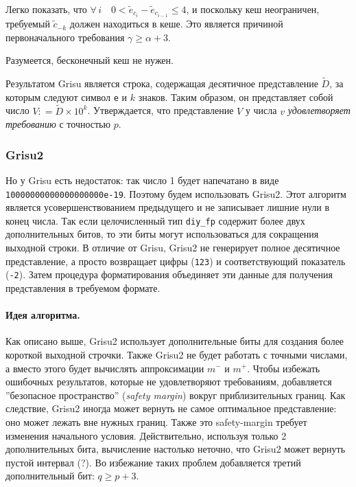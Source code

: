 \documentclass[specialist,subf,href,colorlinks=true,14pt
,times,mtpro,specialist
]{disser}
\begin{document}
Легко показать, что $\forall \, i \quad 0 < \tilde{e}_{c_i} - \tilde{e}_{c_{i-1}} \leqslant 4$, и поскольку кеш неограничен, требуемый $\tilde{c}_{-k}$ должен находиться в кеше. 
Это является причиной первоначального требования $\gamma \geqslant \alpha + 3$.

Разумеется, бесконечный кеш не нужен. 

Результатом \textsf{Grisu} является строка, содержащая десятичное представление $\tilde{D}$, за которым следуют символ \texttt{e} и $k$ знаков. 
Таким образом, он представляет собой число $V: = \tilde{D} \times 10^k$. 
Утверждается, что представление $V$ у числа $v$ \textit{удовлетворяет требованию} с точностью $p$.

\subsubsection{\textsf{Grisu2}}
Но у \textsf{Grisu} есть недостаток: так число 1 будет напечатано в виде \\ \texttt{10000000000000000000e-19}.
Поэтому будем использовать \textsf{Grisu2}.
Этот алгоритм является усовершенствованием предыдущего и не записывает лишние нули в конец числа.
Так если целочисленный тип \texttt{diy\_fp} содержит более двух дополнительных битов, то эти биты могут использоваться для сокращения выходной строки.
В отличие от \textsf{Grisu}, \textsf{Grisu2} не генерирует полное десятичное представление, а просто возвращает цифры (\texttt{123}) и соответствующий показатель (\texttt{-2}). 
Затем процедура форматирования объединяет эти данные для получения представления в требуемом формате.

\paragraph{Идея алгоритма.} 
Как описано выше, \textsf{Grisu2} использует дополнительные биты для создания более короткой выходной строчки. 
Также \textsf{Grisu2} не будет работать с точными числами, а вместо этого будет вычислять аппроксимации $m^{-}$ и $m^+$. 
Чтобы избежать ошибочных результатов, которые не удовлетворяют требованиям, добавляется ''безопасное пространство'' (\textit{safety margin}) вокруг приблизительных границ. 
Как следствие, \textsf{Grisu2} иногда может вернуть не самое оптимальное представление: оно может лежать вне нужных границ. 
Также это safety-margin требует изменения начального условия. 
Действительно, используя только 2 дополнительных бита, вычисление настолько неточно, что \textsf{Grisu2} может вернуть пустой интервал (?).
Во избежание таких проблем добавляется третий дополнительный бит: $q \geqslant p + 3$.
\end{document}
